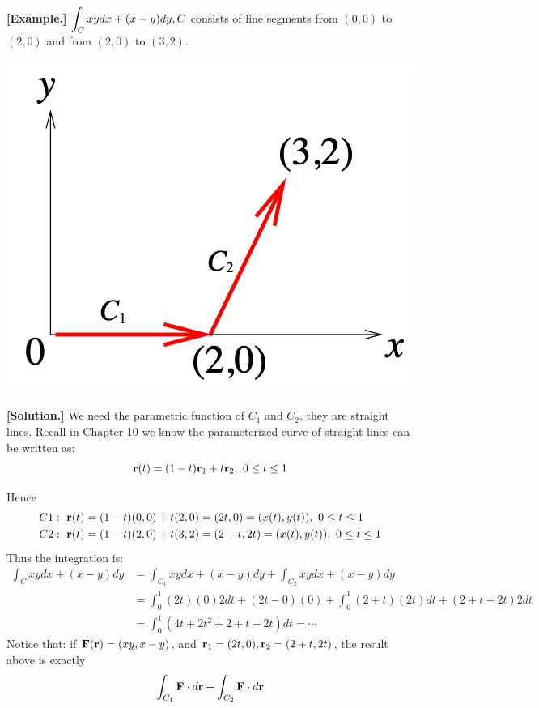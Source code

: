 \documentclass[11pt, a4paper]{MATH2023}
\newcommand{\eg}{\textbf{[Example.] }}
\newcommand{\sol}{\textbf{[Solution.] }}
\newcommand{\rr}{{\bf r}}
\newcommand{\FF}{{\bf F}}
\begin{document}
\begin{spacing}{1.3}
    \eg $\displaystyle \int_{C} x y d x+(x-y) d y, C$ consists of line segments from $(0,0)$ to $(2,0)$ and from $(2,0)$ to $(3,2)$.
    \begin{center}
        \includegraphics[scale=0.38]{images/Ch15-wrt-eg1.png}
    \end{center}

    \sol We need the parametric function of $C_1$ and $C_2$, they are straight lines.
    Recall in Chapter 10 we know the parameterized curve of straight lines can be written as: 
    $$\rr(t)=(1-t)\rr_1+t\rr_2, \ 0\le t\le 1$$

    Hence 
    \begin{align*}
        C1: \ \rr(t) &= (1-t)(0, 0) + t(2, 0) = (2t, 0) = (x(t), y(t)),\ 0\le t\le 1\\
        C2: \ \rr(t) &= (1-t)(2, 0) + t(3, 2) = (2+t, 2t) = (x(t), y(t)),\ 0\le t\le 1
    \end{align*}
    Thus the integration is: 
    \begin{align*}
        \int_C xydx+(x-y)dy &= \int_{C_1} xydx+(x-y)dy + \int_{C_2} xydx+(x-y)dy\\
                    &= \int_0^1 (2t)(0) 2dt+(2t-0)(0) +\int_0^1 (2+t)(2t)dt + (2+t-2t) 2dt\\
                    &= \int_0^1 (4t+2t^2+2+t-2t) dt =\cdots
    \end{align*}
    {\blue Notice that: } if $\FF(\rr)=(xy, x-y)$, and $\rr_1=(2t, 0), \rr_2=(2+t,2t)$, 
    the result above is exactly 
    $$\int_{C_1} \FF\cdot d\rr + \int_{C_2} \FF\cdot d\rr$$


\end{spacing}
\end{document}
